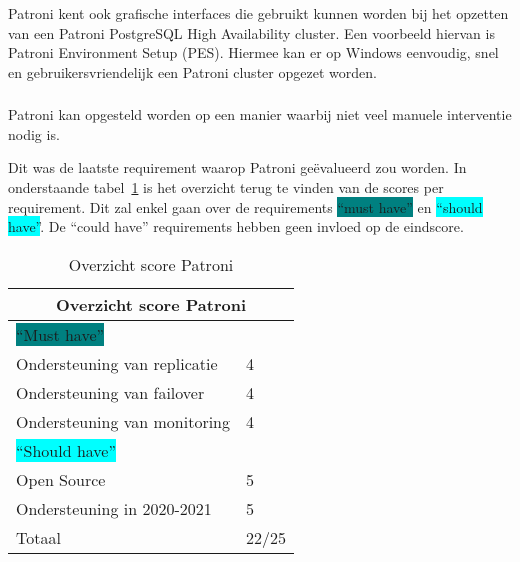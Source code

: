 \subsubsection{}
\label{subsubsec:Grafische interface}

Patroni kent ook grafische interfaces die gebruikt kunnen worden bij het opzetten van een Patroni PostgreSQL High Availability cluster. Een voorbeeld hiervan is Patroni Environment Setup (PES). Hiermee kan er op Windows eenvoudig, snel en gebruikersvriendelijk een Patroni cluster opgezet worden.


\subsubsection{}
\label{subsubsec:Beperkte manuele interventie}

Patroni kan opgesteld worden op een manier waarbij niet veel manuele interventie nodig is.


Dit was de laatste requirement waarop Patroni geëvalueerd zou worden. In onderstaande tabel~\ref{table:Overzicht score Patroni} is het overzicht terug te vinden van de scores per requirement. Dit zal enkel gaan over de requirements \colorbox{teal}{“must have”} en \colorbox{cyan}{“should have”}. De “could have” requirements hebben geen invloed op de eindscore.

\begin{table}[!h]
    \centering
    \begin{tabular}{ |p{6cm}||p{6cm}|  }
        \hline
        \multicolumn{2}{|c|}{Overzicht score Patroni} \\
        \hline
        \colorbox{teal}{“Must have”} & \\
        \hline
        Ondersteuning van replicatie  & 4 \\
        Ondersteuning van failover &  4 \\
        Ondersteuning van monitoring & 4 \\
        \hline
        \colorbox{cyan}{“Should have”} & \\
        \hline
        Open Source &  5 \\
        Ondersteuning in 2020-2021 & 5 \\
        \hline
        \hline
        Totaal & 22/25 \\
        \hline
    \end{tabular}
    \caption{Overzicht score Patroni}
    \label{table:Overzicht score Patroni}
\end{table}

